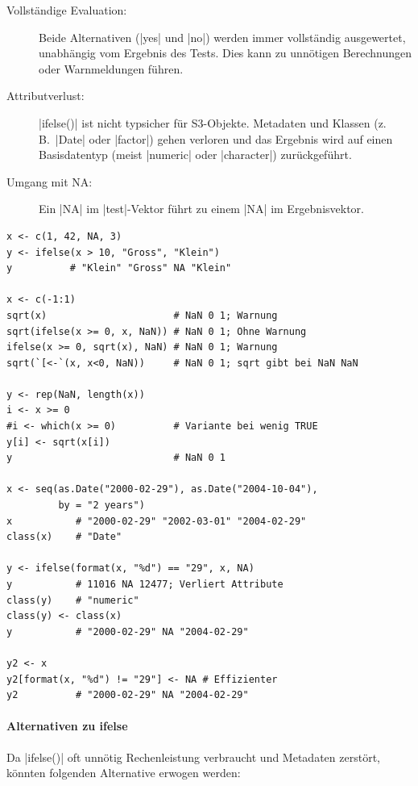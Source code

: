 \documentclass[10pt,twocolumn]{scrartcl}
\renewcommand{\lstinline}{\mycoloredinline}
\begin{document}
\begin{description}
\item[Vollständige Evaluation:] Beide Alternativen (\lstinline|yes| und \lstinline|no|) werden immer vollständig ausgewertet, unabhängig vom Ergebnis des Tests. Dies kann zu unnötigen Berechnungen oder Warnmeldungen führen.
\item[Attributverlust:] \lstinline|ifelse()| ist nicht typsicher für S3-Objekte. Metadaten und Klassen (z.\,B.\ \lstinline|Date| oder \lstinline|factor|) gehen verloren und das Ergebnis wird auf einen Basisdatentyp (meist \lstinline|numeric| oder \lstinline|character|) zurückgeführt.
\item[Umgang mit NA:] Ein \lstinline|NA| im \lstinline|test|-Vektor führt zu einem \lstinline|NA| im Ergebnisvektor.
\end{description}

\begin{lstlisting}
x <- c(1, 42, NA, 3)
y <- ifelse(x > 10, "Gross", "Klein")
y          # "Klein" "Gross" NA "Klein"

x <- c(-1:1)
sqrt(x)                      # NaN 0 1; Warnung
sqrt(ifelse(x >= 0, x, NaN)) # NaN 0 1; Ohne Warnung
ifelse(x >= 0, sqrt(x), NaN) # NaN 0 1; Warnung
sqrt(`[<-`(x, x<0, NaN))     # NaN 0 1; sqrt gibt bei NaN NaN

y <- rep(NaN, length(x))
i <- x >= 0
#i <- which(x >= 0)          # Variante bei wenig TRUE
y[i] <- sqrt(x[i])
y                            # NaN 0 1

x <- seq(as.Date("2000-02-29"), as.Date("2004-10-04"),
         by = "2 years")
x           # "2000-02-29" "2002-03-01" "2004-02-29"
class(x)    # "Date"

y <- ifelse(format(x, "%d") == "29", x, NA)
y           # 11016 NA 12477; Verliert Attribute
class(y)    # "numeric"
class(y) <- class(x)
y           # "2000-02-29" NA "2004-02-29"

y2 <- x
y2[format(x, "%d") != "29"] <- NA # Effizienter
y2          # "2000-02-29" NA "2004-02-29"
\end{lstlisting}

\paragraph{Alternativen zu ifelse}

Da \lstinline|ifelse()| oft unnötig Rechenleistung verbraucht und Metadaten zerstört, könnten folgenden Alternative erwogen werden:
\end{document}
